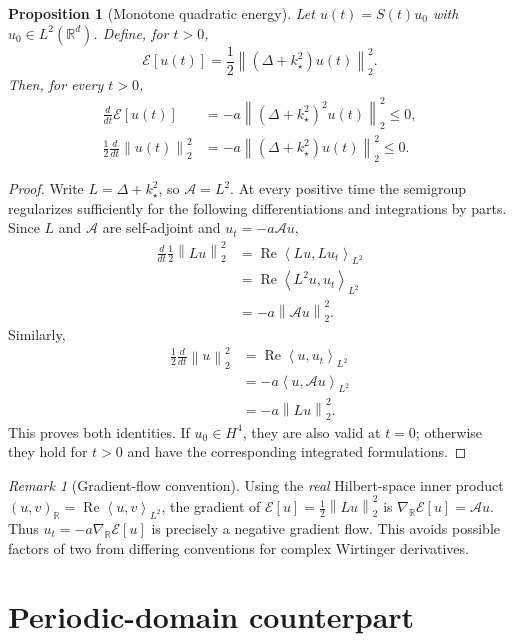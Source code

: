 \documentclass[11pt]{article}
\newtheorem{proposition}[theorem]{Proposition}
\theoremstyle{remark}
\newtheorem{remark}[theorem]{Remark}
\newcommand{\R}{\mathbb{R}}
\newcommand{\sA}{\mathcal{A}}
\newcommand{\sE}{\mathcal{E}}
\newcommand{\norm}[1]{\left\lVert #1\right\rVert}
\newcommand{\inner}[2]{\left\langle #1,#2\right\rangle}
\begin{document}
\begin{proposition}[Monotone quadratic energy]\label{prop:energy}
Let $u(t)=S(t)u_0$ with $u_0\in L^2(\R^d)$.  Define, for $t>0$,
\begin{equation}\label{eq:energy}
\sE[u(t)]=\frac12\norm{(\Delta+k_\star^2)u(t)}_2^2.
\end{equation}
Then, for every $t>0$,
\begin{align}
\frac{d}{dt}\sE[u(t)]
&=-a\norm{(\Delta+k_\star^2)^2u(t)}_2^2\le0,
\label{eq:energy-identity}\\
\frac12\frac{d}{dt}\norm{u(t)}_2^2
&=-a\norm{(\Delta+k_\star^2)u(t)}_2^2\le0.
\label{eq:mass-identity}
\end{align}
\end{proposition}
\begin{proof}
Write $L=\Delta+k_\star^2$, so $\sA=L^2$.  At every positive
time the semigroup regularizes sufficiently for the following
differentiations and integrations by parts.  Since $L$ and $\sA$ are
self-adjoint and $u_t=-a\sA u$,
\begin{align}
\frac{d}{dt}\frac12\norm{Lu}_2^2
&=\operatorname{Re}\inner{Lu}{Lu_t}_{L^2}\\
&=\operatorname{Re}\inner{L^2u}{u_t}_{L^2}\\
&=-a\norm{\sA u}_2^2.
\end{align}
Similarly,
\begin{align}
\frac12\frac{d}{dt}\norm{u}_2^2
&=\operatorname{Re}\inner{u}{u_t}_{L^2}\\
&=-a\inner{u}{\sA u}_{L^2}\\
&=-a\norm{Lu}_2^2.
\end{align}
This proves both identities.  If $u_0\in H^4$, they are also valid
at $t=0$; otherwise they hold for $t>0$ and have the corresponding
integrated formulations.
\end{proof}

\begin{remark}[Gradient-flow convention]
Using the \emph{real} Hilbert-space inner product
$(u,v)_{\R}=\operatorname{Re}\inner{u}{v}_{L^2}$, the gradient of
$\sE[u]=\frac12\norm{Lu}_2^2$ is $\nabla_{\R}\sE[u]=\sA u$.
Thus $u_t=-a\nabla_{\R}\sE[u]$ is precisely a negative gradient flow.
This avoids possible factors of two from differing conventions for
complex Wirtinger derivatives.
\end{remark}

\section{Periodic-domain counterpart}
\end{document}

